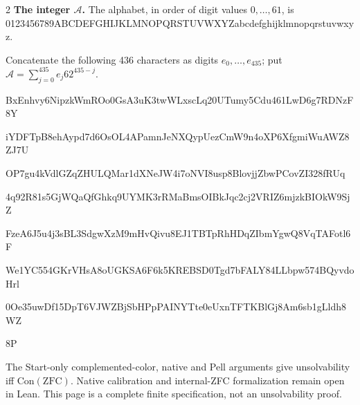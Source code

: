 \documentclass[10pt]{article}
\begin{document}
\begin{multicols}{2}
\textbf{The integer $\mathcal A$.}
The alphabet, in order of digit values $0,\ldots,61$, is
{\fontsize{7.7}{8.2}\selectfont\ttfamily 0123456789ABCDEFGHIJKLMNOPQRSTUVWXYZabcdefghijklmnopqrstuvwxyz}.\par
Concatenate the following 436 characters as digits $e_0,\ldots,e_{435}$;
put $\mathcal A=\sum_{j=0}^{435}e_j62^{435-j}$.\par
\begingroup\fontsize{7.7}{8.2}\selectfont\ttfamily
BxEnhvy6NipzkWmROo0GsA3uK3twWLxscLq20UTumy5Cdu461LwD6g7RDNzF8Y\par
iYDFTpB8ehAypd7d6OsOL4APamnJeNXQypUezCmW9n4oXP6XfgmiWuAWZ8ZJ7U\par
OP7gu4kVdlGZqZHULQMar1dXNeJW4i7oNVI8usp8BlovjjZbwPCovZI328fRUq\par
4q92R81s5GjWQaQfGhkq9UYMK3rRMaBmsOIBkJqc2cj2VRIZ6mjzkBIOkW9SjZ\par
FzeA6J5u4j3sBL3SdgwXzM9mHvQivu8EJ1TBTpRhHDqZIbmYgwQ8VqTAFotl6F\par
We1YC554GKrVHsA8oUGKSA6F6k5KREBSD0Tgd7bFALY84LLbpw574BQyvdoHrl\par
0Oe35uwDf15DpT6VJWZBjSbHPpPAINYTte0eUxnTFTKBlGj8Am6sb1gLldh8WZ\par
8P\par
\endgroup
\normalfont\fontsize{7.7}{8.2}\selectfont
The Start-only complemented-color, native and Pell arguments give
unsolvability iff $\mathrm{Con}(\mathrm{ZFC})$.
Native calibration and internal-ZFC formalization remain open in Lean.
This page is a complete finite specification, not an unsolvability proof.
\end{multicols}
\end{document}
